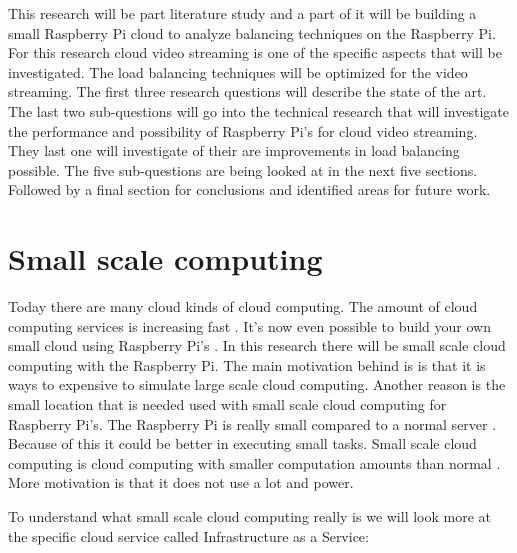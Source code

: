 \documentclass{sig-alternate-br}
\begin{document}
This research will be part literature study and a part of it will be building a small Raspberry Pi cloud to analyze balancing techniques on the Raspberry Pi. For this research cloud video streaming is one of the specific aspects that will be investigated. The load balancing techniques will be optimized for the video streaming. The first three research questions will describe the state of the art. 
The last two sub-questions will go into the technical research that will investigate the performance and possibility of Raspberry Pi's for cloud video streaming. They last one will investigate of their are improvements in load balancing possible. The five sub-questions are being looked at in the next five sections. Followed by a final section for conclusions and identified areas for future
work.


\section{Small scale computing}
Today there are many cloud kinds of cloud computing. The amount of cloud computing services is increasing fast \cite{armbrust:2009}. It's now even possible to build your own small cloud using Raspberry Pi's \cite{southampton}. In this research there will be small scale cloud computing with the Raspberry Pi. The main motivation behind is is that it is ways to expensive to simulate large scale cloud computing. Another reason is the small location that is needed used with small scale cloud computing for Raspberry Pi's\cite{Pcextreme}. The Raspberry Pi is really small compared to a normal server \cite{cox:2014}. Because of this it could be better in executing small tasks. Small scale cloud computing is cloud computing with smaller computation amounts than normal \cite{cox:2014}. More motivation is that it does not use a lot and power. 

To understand what small scale cloud computing really is we will look more at the specific cloud service called Infrastructure as a Service:


 
\end{document}
